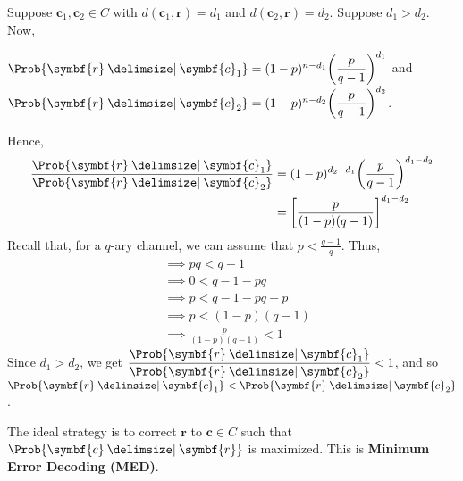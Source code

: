 \begin{Proof}{}{}
    Suppose $ \symbf{c}_1,\symbf{c}_2\in C $ with $ d(\symbf{c}_1,\symbf{r})=d_1 $
    and $ d(\symbf{c}_2,\symbf{r})=d_2 $.
    Suppose $ d_1>d_2 $. Now,

    $ \Prob{\symbf{r}\given \symbf{c}_1}=(1-p)^{n-d_1}\biggl(\dfrac{p}{q-1} \biggr)^{d_1} $ and
    $ \Prob{\symbf{r}\given \symbf{c}_2}=(1-p)^{n-d_2}\biggl( \dfrac{p}{q-1} \biggr)^{d_2} $.

    Hence,
    \begin{align*}
        \frac{\Prob{\symbf{r}\given \symbf{c}_1}}{\Prob{\symbf{r}\given \symbf{c}_2}}
         & =(1-p)^{d_2-d_1}\biggl(\frac{p}{q-1}  \biggr)^{d_1-d_2} \\
         & =\biggl[ \frac{p}{(1-p)(q-1)}  \biggr]^{d_1-d_2}
    \end{align*}
    Recall that, for a $ q $-ary channel, we can assume that $ p<\frac{q-1}{q} $. Thus,
    \begin{align*}
         & \implies pq < q-1                 \\
         & \implies 0 < q-1-pq               \\
         & \implies p < q-1-pq+p             \\
         & \implies p < (1-p)(q-1)           \\
         & \implies \frac{p}{(1-p)(q-1)} < 1
    \end{align*}
    Since $ d_1>d_2 $, we get $ \dfrac{\Prob{\symbf{r}\given \symbf{c}_1}}{\Prob{\symbf{r}\given \symbf{c}_2}} < 1 $, and so
    $ \Prob{\symbf{r}\given \symbf{c}_1}<\Prob{\symbf{r}\given \symbf{c}_2} $.
\end{Proof}
The ideal strategy is to correct $ \symbf{r} $ to $ \symbf{c}\in C $ such that
$ \Prob{\symbf{c}\given \symbf{r}} $ is maximized. This is \textbf{Minimum Error Decoding (MED)}.


